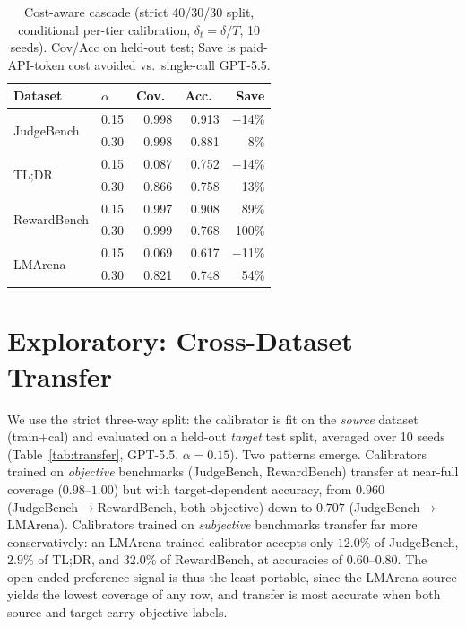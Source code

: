 \begin{table}[t]
\centering
\small
\setlength{\tabcolsep}{4pt}
\caption{Cost-aware cascade (strict 40/30/30 split, conditional per-tier calibration, $\delta_t{=}\delta/T$, 10 seeds). Cov/Acc on held-out test; Save is paid-API-token cost avoided vs.\ single-call GPT-5.5.}
\label{tab:cascade}
\begin{tabular}{llrrr}
\toprule
Dataset & $\alpha$ & Cov.\ & Acc.\ & Save \\
\midrule
\multirow{2}{*}{JudgeBench} & 0.15 & 0.998 & 0.913 & $-$14\% \\
 & 0.30 & 0.998 & 0.881 & 8\% \\
\midrule
\multirow{2}{*}{TL;DR} & 0.15 & 0.087 & 0.752 & $-$14\% \\
 & 0.30 & 0.866 & 0.758 & 13\% \\
\midrule
\multirow{2}{*}{RewardBench} & 0.15 & 0.997 & 0.908 & 89\% \\
 & 0.30 & 0.999 & 0.768 & 100\% \\
\midrule
\multirow{2}{*}{LMArena} & 0.15 & 0.069 & 0.617 & $-$11\% \\
 & 0.30 & 0.821 & 0.748 & 54\% \\
\bottomrule
\end{tabular}
\end{table}

\section{Exploratory: Cross-Dataset Transfer}
\label{app:transfer}

We use the strict three-way split: the calibrator is fit on the \emph{source} dataset (train+cal) and evaluated on a held-out \emph{target} test split, averaged over 10 seeds (Table~\ref{tab:transfer}, GPT-5.5, $\alpha{=}0.15$). Two patterns emerge. Calibrators trained on \emph{objective} benchmarks (JudgeBench, RewardBench) transfer at near-full coverage ($0.98$--$1.00$) but with target-dependent accuracy, from $0.960$ (JudgeBench$\to$RewardBench, both objective) down to $0.707$ (JudgeBench$\to$LMArena). Calibrators trained on \emph{subjective} benchmarks transfer far more conservatively: an LMArena-trained calibrator accepts only $12.0\%$ of JudgeBench, $2.9\%$ of TL;DR, and $32.0\%$ of RewardBench, at accuracies of $0.60$--$0.80$. The open-ended-preference signal is thus the least portable, since the LMArena source yields the lowest coverage of any row, and transfer is most accurate when both source and target carry objective labels.

